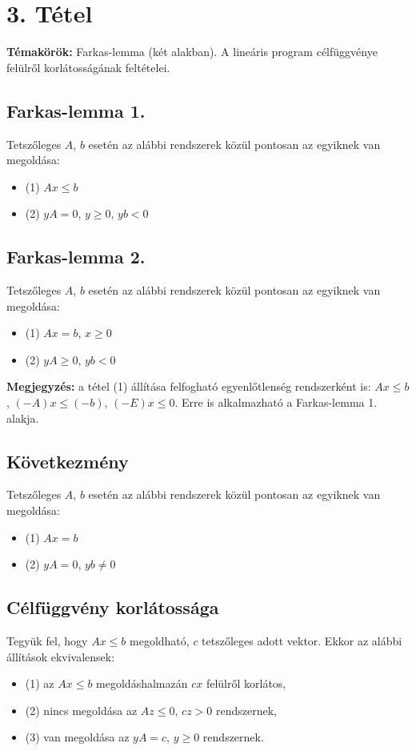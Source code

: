 
\setcounter{chapter}{3}
\chapter*{3. Tétel}

\textbf{Témakörök:} Farkas-lemma (két alakban). A lineáris program célfüggvénye felülről korlátosságának feltételei.

\noindent\hrulefill

\section*{Farkas-lemma 1.}
Tetszőleges $A$, $b$ esetén az alábbi rendszerek közül pontosan az egyiknek van megoldása:
\begin{itemize}
\item (1) $Ax\leq b$
\item (2) $yA=0$, $y\geq 0$, $yb<0$
\end{itemize}

\section*{Farkas-lemma 2.}
Tetszőleges $A$, $b$ esetén az alábbi rendszerek közül pontosan az egyiknek van megoldása:
\begin{itemize}
\item (1) $Ax=b$, $x\geq 0$
\item (2) $yA\geq 0$, $yb<0$
\end{itemize}

\textbf{Megjegyzés:} a tétel (1) állítása felfogható egyenlőtlenség rendszerként is: $Ax\leq b$, $(-A)x\leq (-b)$, $(-E)x\leq 0$. Erre is alkalmazható a Farkas-lemma 1. alakja.

\section*{Következmény}
Tetszőleges $A$, $b$ esetén az alábbi rendszerek közül pontosan az egyiknek van megoldása:
\begin{itemize}
\item (1) $Ax=b$
\item (2) $yA=0$, $yb\neq 0$
\end{itemize}

\section*{Célfüggvény korlátossága}
Tegyük fel, hogy $Ax\leq b$ megoldható, $c$ tetszőleges adott vektor. Ekkor az alábbi állítások ekvivalensek:
\begin{itemize}
\item (1) az $Ax\leq b$ megoldáshalmazán $cx$ felülről korlátos,
\item (2) nincs megoldása az $Az\leq 0$, $cz>0$ rendszernek,
\item (3) van megoldása az $yA=c$, $y\geq 0$ rendszernek.
\end{itemize}